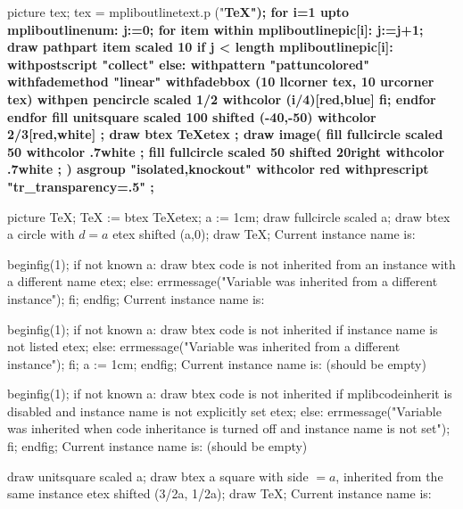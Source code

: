   picture tex;
  tex = mpliboutlinetext.p ("\bf \TeX");
  for i=1 upto mpliboutlinenum:
    j:=0;
    for item within mpliboutlinepic[i]:
      j:=j+1;
      draw pathpart item scaled 10
      if j < length mpliboutlinepic[i]:
          withpostscript "collect"
      else:
          withpattern "pattuncolored"
          withfademethod "linear"
          withfadebbox (10 llcorner tex, 10 urcorner tex)
          withpen pencircle scaled 1/2
          withcolor (i/4)[red,blue]
      fi;
    endfor
  endfor
\endmpfig
\mpfig
fill unitsquare scaled 100 shifted (-40,-50)
  withcolor 2/3[red,white] ;
draw btex \TeX etex ;
draw image(
    fill fullcircle scaled 50
      withcolor .7white ;
    fill fullcircle scaled 50 shifted 20right
      withcolor .7white ;
  )
  asgroup "isolated,knockout"
  withcolor red
  withprescript "tr_transparency=.5"
  ;
\endmpfig
{}

\baselineskip
{}

\mplibcode[instanceOne]
  picture TeX;
  TeX := btex \TeX etex;
a := 1cm;
draw fullcircle scaled a;
draw btex a circle with $d=a$ etex shifted (a,0);
draw TeX;
\endmplibcode
Current instance name is: \currentmpinstancename {}\baselineskip

\mplibcode[instanceTwo]
beginfig(1);
if not known a:
  draw btex code is not inherited from an instance with a different name etex;
else:
  errmessage("Variable was inherited from a different instance");
fi;
endfig;
\endmplibcode
Current instance name is: \currentmpinstancename {}\baselineskip

\mplibcode
beginfig(1);
if not known a:
  draw btex code is not inherited if instance name is not listed etex;
else:
  errmessage("Variable was inherited from a different instance");
fi;
a := 1cm;
endfig;
\endmplibcode
Current instance name is: \currentmpinstancename (should be empty) \baselineskip

\mplibcode
beginfig(1);
if not known a:
  draw btex code is not inherited if mplibcodeinherit is disabled and instance name is not explicitly set etex;
else:
  errmessage("Variable was inherited when code inheritance is turned off and instance name is not set");
fi;
endfig;
\endmplibcode
Current instance name is: \currentmpinstancename (should be empty) \baselineskip

\mplibcode[instanceOne]
draw unitsquare scaled a;
draw btex a square with side $=a$, inherited from the same instance etex shifted (3/2a, 1/2a);
  draw TeX;
\endmplibcode
Current instance name is: \currentmpinstancename {}\baselineskip

\bye
